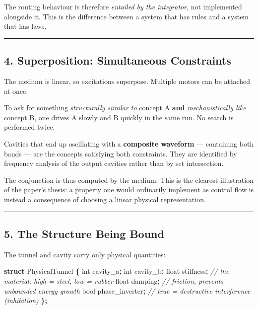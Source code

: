 \documentclass[
  11pt,
  a4paper,
]{article}
\newenvironment{Shaded}{\begin{snugshade}}{\end{snugshade}}
\newcommand{\CommentTok}[1]{\textcolor[rgb]{0.56,0.35,0.01}{\textit{#1}}}
\newcommand{\DataTypeTok}[1]{\textcolor[rgb]{0.13,0.29,0.53}{#1}}
\newcommand{\KeywordTok}[1]{\textcolor[rgb]{0.13,0.29,0.53}{\textbf{#1}}}
\newcommand{\NormalTok}[1]{#1}
\newcommand{\OperatorTok}[1]{\textcolor[rgb]{0.81,0.36,0.00}{\textbf{#1}}}
\begin{document}
The routing behaviour is therefore \emph{entailed by the integrator},
not implemented alongside it. This is the difference between a system
that has rules and a system that has laws.

\begin{center}\rule{0.5\linewidth}{0.5pt}\end{center}

\subsection{4. Superposition: Simultaneous
Constraints}\label{superposition-simultaneous-constraints}

The medium is linear, so excitations superpose. Multiple motors can be
attached at once.

To ask for something \emph{structurally similar to} concept A
\textbf{and} \emph{mechanistically like} concept B, one drives A slowly
and B quickly in the same run. No search is performed twice.

Cavities that end up oscillating with a \textbf{composite waveform} ---
containing both bands --- are the concepts satisfying both constraints.
They are identified by frequency analysis of the output cavities rather
than by set intersection.

The conjunction is thus computed by the medium. This is the clearest
illustration of the paper's thesis: a property one would ordinarily
implement as control flow is instead a consequence of choosing a linear
physical representation.

\begin{center}\rule{0.5\linewidth}{0.5pt}\end{center}

\subsection{5. The Structure Being
Bound}\label{the-structure-being-bound}

The tunnel and cavity carry only physical quantities:

\begin{Shaded}
\begin{Highlighting}[]
\KeywordTok{struct}\NormalTok{ PhysicalTunnel }\OperatorTok{\{}
    \DataTypeTok{int}\NormalTok{   cavity\_a}\OperatorTok{;}
    \DataTypeTok{int}\NormalTok{   cavity\_b}\OperatorTok{;}
    \DataTypeTok{float}\NormalTok{ stiffness}\OperatorTok{;}      \CommentTok{// the material: high = steel, low = rubber}
    \DataTypeTok{float}\NormalTok{ damping}\OperatorTok{;}        \CommentTok{// friction, prevents unbounded energy growth}
    \DataTypeTok{bool}\NormalTok{  phase\_inverter}\OperatorTok{;} \CommentTok{// true = destructive interference (inhibition)}
\OperatorTok{\};}
\end{Highlighting}
\end{Shaded}
\end{document}
